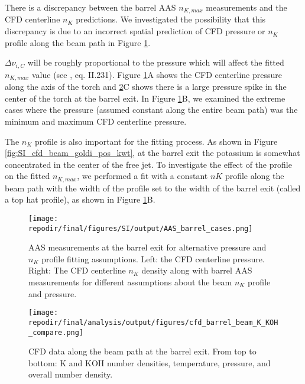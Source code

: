 There is a discrepancy between the barrel AAS $n_{K,max}$ measurements and the CFD centerline $n_{K}$ predictions. We investigated the possibility that this discrepancy is due to an incorrect spatial prediction of CFD pressure or $n_{K}$ profile along the beam path in Figure \ref{fig:SI_AAS_barrel_cases}.  

$\Delta \nu_{i,C}$ will be roughly proportional to the pressure which will affect the fitted $n_{K,max}$ value (see \cite{alkemadeMetalVapoursFlames1982}, eq. II.231). Figure \ref{fig:SI_AAS_barrel_cases}A shows the CFD centerline pressure along the axis of the torch and \ref{fig:SI_cfd_barrel_beam_K_KOH_compare}C shows there is a large pressure spike in the center of the torch at the barrel exit. In Figure \ref{fig:SI_AAS_barrel_cases}B, we examined the extreme cases where the pressure (assumed constant along the entire beam path) was the minimum and maximum CFD centerline pressure. 

The $n_{K}$ profile is also important for the fitting process. As shown in Figure \ref{fig:SI_cfd_beam_goldi_pos_kwt}, at the barrel exit the potassium is somewhat concentrated in the center of the free jet. To investigate the effect of the profile on the fitted $n_{K,max}$, we performed a fit with a constant $n{K}$ profile along the beam path with the width of the profile set to the width of the barrel exit (called a top hat profile), as shown in Figure \ref{fig:SI_AAS_barrel_cases}B.


\begin{figure}[]
    \centering
    \texttt{[image: \\repodir/final/figures/SI/output/AAS\_barrel\_cases.png]}
    \caption{AAS measurements at the barrel exit for alternative pressure and $n_{K}$ profile fitting assumptions. Left: the CFD centerline pressure. Right: The CFD centerline $n_{K}$ density along with barrel AAS measurements for different assumptions about the beam $n_{K}$ profile and pressure. }
    \label{fig:SI_AAS_barrel_cases}
\end{figure}


\begin{figure}[]
    \centering
    \texttt{[image: \\repodir/final/analysis/output/figures/cfd\_barrel\_beam\_K\_KOH\_compare.png]}
    \caption{CFD data along the beam path at the barrel exit. From top to bottom: K and KOH number densities, temperature, pressure, and overall number density. }
    \label{fig:SI_cfd_barrel_beam_K_KOH_compare}
\end{figure}



